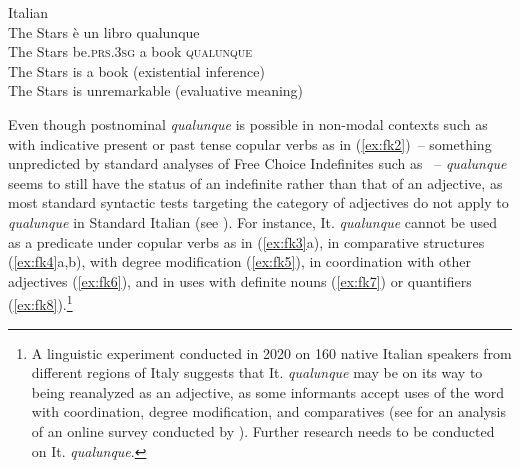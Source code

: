 \documentclass[output=paper,colorlinks,citecolor=brown]{langscibook}
\begin{document}
\ea\label{ex:fk2} Italian \citep[2]{Kellert2021a}\\
    \gll    The Stars è un libro qualunque\\
            The Stars be.\textsc{prs.3sg} a book \textsc{qualunque}\\
    \glt    The Stars is a book (existential inference)\\
            The Stars is unremarkable (evaluative meaning)
\z



Even though postnominal \textit{qualunque} is possible in non-modal contexts such as with indicative present or past tense copular verbs as in (\ref{ex:fk2})~-- something unpredicted by standard analyses of Free Choice Indefinites such as \citet{Chierchia2006}~-- \textit{qualunque} seems to still have the status of an indefinite rather than that of an adjective, as most standard syntactic tests targeting the category of adjectives do not apply to \textit{qualunque} in Standard Italian (see \cite{Kellert2021a}). For instance, It. \textit{qualunque} cannot be used as a predicate under copular verbs as in (\ref{ex:fk3}a), in comparative structures (\ref{ex:fk4}a,b), with degree modification (\ref{ex:fk5}), in coordination with other adjectives (\ref{ex:fk6}), and in uses with definite nouns (\ref{ex:fk7}) or quantifiers (\ref{ex:fk8}).\footnote{A linguistic experiment conducted in 2020 on 160 native Italian speakers from different regions of Italy suggests that It. \textit{qualunque} may be on its way to being reanalyzed as an adjective, as some informants accept uses of the word with coordination, degree modification, and comparatives (see \cite{Kellert2021b} for an analysis of an online survey conducted by \cite{Francia2020}). Further research needs to be conducted on It. \textit{qualunque}.}
\end{document}
